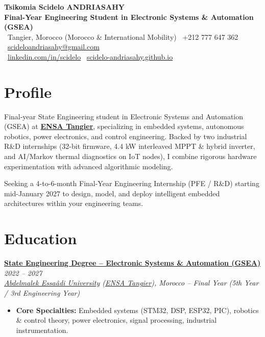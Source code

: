 \documentclass[10pt, a4paper]{article}
\newcommand{\cventry}[4]{%
    \noindent\textbf{#1} \hfill \textit{#2} \\
    \textit{#3} \hfill {\footnotesize #4} \vspace{0.2ex}
}
\begin{document}
\pagestyle{empty}
\small

\begin{center}
	{\huge \textbf{Tsikomia Scidelo ANDRIASAHY}}\\[0.5ex]
	{\large \textcolor{primary}{\textbf{Final-Year Engineering Student in Electronic Systems \& Automation (GSEA)}}}\\[0.5ex]
	\small
	\faMapMarker \ Tangier, Morocco (Morocco \& International Mobility) \quad
	\faPhone \ +212 777 647 362 \quad
	\faEnvelope \ \href{mailto:scideloandriasahy@gmail.com}{scideloandriasahy@gmail.com} \\[0.5ex]
	\faLinkedin \ \href{https://linkedin.com/in/scidelo}{linkedin.com/in/scidelo} \quad
	\faGithub \ \href{https://scidelo-andriasahy.github.io/}{scidelo-andriasahy.github.io}
\end{center}

\vspace{-1ex}

\section*{Profile}
\noindent Final-year State Engineering student in Electronic Systems and Automation (GSEA) at \href{https://ensat.ac.ma/Portail/}{\textbf{ENSA Tangier}}, specializing in embedded systems, autonomous robotics, power electronics, and control engineering. Backed by two industrial R\&D internships (32-bit firmware, 4.4 kW interleaved MPPT \& hybrid inverter, and AI/Markov thermal diagnostics on IoT nodes), I combine rigorous hardware experimentation with advanced algorithmic modeling.

\noindent Seeking a 4-to-6-month Final-Year Engineering Internship (PFE / R\&D) starting mid-January 2027 to design, model, and deploy intelligent embedded architectures within your engineering teams.

\section*{Education}

\cventry{\href{https://ensat.ac.ma/Portail/genie-des-systemes-electroniques-et-automatiques-gsea/}{State Engineering Degree -- Electronic Systems \& Automation (GSEA)}}{2022 -- 2027}
{\href{https://www.uae.ac.ma/}{Abdelmalek Essa\^{a}di University} (\href{https://ensat.ac.ma/Portail/}{ENSA Tangier}), Morocco -- \textit{Final Year (5th Year / 3rd Engineering Year)}}{}
\begin{itemize}
	\item \textbf{Core Specialties:} Embedded systems (STM32, DSP, ESP32, PIC), robotics \& control theory, power electronics, signal processing, industrial instrumentation.
\end{itemize}
\vspace{0.6ex}
\end{document}
